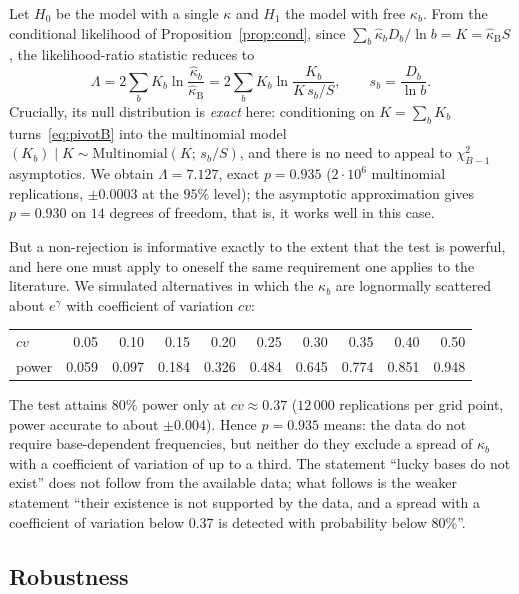 \documentclass[11pt,a4paper]{article}
\theoremstyle{plain}
\theoremstyle{remark}
\newcommand{\eg}{e^{\gamma}}
\begin{document}
Let $H_0$ be the model with a single $\kappa$ and $H_1$ the model with free
$\kappa_b$. From the conditional likelihood of Proposition~\ref{prop:cond}, since
$\sum_b\hat\kappa_bD_b/\ln b=K=\hat\kappa_{\mathrm B}S$, the likelihood-ratio
statistic reduces to
\begin{equation}\label{eq:LR}
\Lambda=2\sum_b K_b \ln\frac{\hat\kappa_b}{\hat\kappa_{\mathrm B}}
=2\sum_b K_b\ln\frac{K_b}{K\,s_b/S},\qquad s_b=\frac{D_b}{\ln b}.
\end{equation}
Crucially, its null distribution is \emph{exact} here: conditioning on
$K=\sum_bK_b$ turns~\eqref{eq:pivotB} into the multinomial model
$(K_b)\mid K\sim\mathrm{Multinomial}(K;\,s_b/S)$, and there is no need to appeal
to $\chi^2_{B-1}$ asymptotics. We obtain $\Lambda=7.127$, exact $p=0.935$
($2\cdot10^6$ multinomial replications, $\pm0.0003$ at the $95\%$ level); the
asymptotic
approximation gives $p=0.930$ on $14$ degrees of freedom, that is, it works well
in this case.

But a non-rejection is informative exactly to the extent that the test is
powerful, and here one must apply to oneself the same requirement one applies to
the literature. We simulated alternatives in which the $\kappa_b$ are lognormally
scattered about $\eg$ with coefficient of variation $cv$:

\begin{center}
\small
\begin{tabular}{lrrrrrrrrr}
\toprule
$cv$ & 0.05 & 0.10 & 0.15 & 0.20 & 0.25 & 0.30 & 0.35 & 0.40 & 0.50\\
power & 0.059 & 0.097 & 0.184 & 0.326 & 0.484 & 0.645 & 0.774 & 0.851 & 0.948\\
\bottomrule
\end{tabular}
\end{center}

The test attains $80\%$ power only at $cv\approx0.37$ ($12\,000$ replications
per grid point, power accurate to about $\pm0.004$). Hence $p=0.935$ means: the
data do not require base-dependent frequencies, but neither do they exclude a
spread of $\kappa_b$ with a coefficient of variation of up to a third. The
statement ``lucky bases do not exist'' does not follow from the available data;
what follows is the weaker statement ``their existence is not supported by the
data, and a spread with a coefficient of variation below $0.37$ is detected with
probability below $80\%$''.

\subsection{Robustness}\label{sec:robust}
\end{document}
